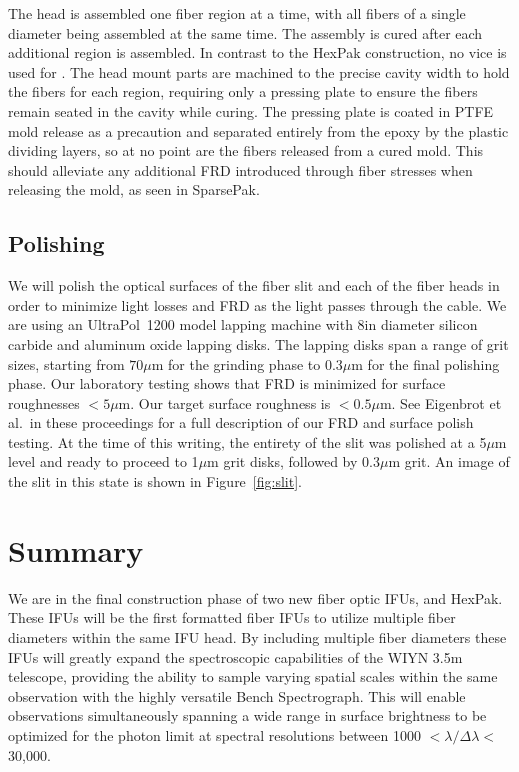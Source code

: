 The \GP head is assembled one fiber region at a time, with all fibers of a
single diameter being assembled at the same time.  The assembly is cured after
each additional region is assembled.  In contrast to the HexPak construction,
no vice is used for \GP.  The head mount parts are machined to the precise
cavity width to hold the fibers for each region, requiring only a pressing
plate to ensure the fibers remain seated in the cavity while curing.  The
pressing plate is coated in PTFE mold release as a precaution and separated
entirely from the epoxy by the plastic dividing layers, so at no point are the
fibers released from a cured mold.  This should alleviate any additional FRD
introduced through fiber stresses when releasing the mold, as seen in
SparsePak.


\subsection{Polishing}
\label{subsec:polishing}
We will polish the optical surfaces of the fiber slit and each of the fiber
heads in order to minimize light losses and FRD as the light passes through
the cable.  We are using an UltraPol\footnotemark[2]\ 1200 model lapping
machine with 8in diameter silicon carbide and aluminum oxide lapping disks.
 The lapping disks span a range of grit
sizes, starting from $70\mu$m for the grinding phase to $0.3\mu$m for the
final polishing phase.  Our laboratory testing shows that FRD is minimized for
surface roughnesses $<5\mu$m.  Our target surface roughness is $<0.5\mu$m.
See Eigenbrot et al.\ in these proceedings for a full description of our FRD
and surface polish testing.  At the time of this writing, the entirety of the
slit was polished at a 5$\mu$m level and ready to proceed to 1$\mu$m grit
disks, followed by 0.3$\mu$m grit.  An image of the slit in this state is
shown in Figure~\ref{fig:slit}.


\section{Summary} 
\label{GPB:sec:conclusion}

We are in the final construction phase of two new fiber optic IFUs, \GP
and HexPak.  These IFUs will be the first formatted fiber IFUs to utilize
multiple fiber diameters within the same IFU head.  By including multiple
fiber diameters these IFUs will greatly expand the spectroscopic capabilities
of the WIYN 3.5m telescope, providing the ability to sample varying spatial
scales within the same observation with the highly versatile Bench
Spectrograph.  This will enable observations simultaneously spanning a wide
range in surface brightness to be optimized for the photon limit at spectral
resolutions between 1000 $< \lambda/\Delta\lambda <$ 30,000.



